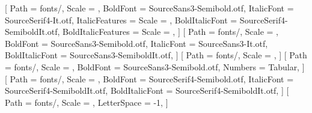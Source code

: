 \setmainfont{SourceSans3-Regular.otf}[
  Path = fonts/,
  Scale = \cv@scale,
  BoldFont = SourceSans3-Semibold.otf,
  ItalicFont = SourceSerif4-It.otf,
  ItalicFeatures = {Scale = },
  BoldItalicFont = SourceSerif4-SemiboldIt.otf,
  BoldItalicFeatures = {Scale = },
]
\setsansfont{SourceSans3-Regular.otf}[
  Path = fonts/,
  Scale = \cv@scale,
  BoldFont = SourceSans3-Semibold.otf,
  ItalicFont = SourceSans3-It.otf,
  BoldItalicFont = SourceSans3-SemiboldIt.otf,
]
\setmonofont{SourceCodePro-Regular.otf}[
  Path = fonts/,
  Scale = ,
]
\newfontfamily{}[
  Path = fonts/,
  Scale = \cv@scale,
  BoldFont = SourceSans3-Semibold.otf,
  Numbers = Tabular,
]
\newfontfamily{}[
  Path = fonts/,
  Scale = \cv@scale,
  BoldFont = SourceSerif4-Semibold.otf,
  ItalicFont = SourceSerif4-SemiboldIt.otf,
  BoldItalicFont = SourceSerif4-SemiboldIt.otf,
]
\newfontfamily{}[
  Path = fonts/,
  Scale = \cv@scale,
  LetterSpace = -1,
]



\AtBeginDocument{\color{cvink}}


\newlength\cvcol    \setlength\cvcol{22mm}   %
\newlength\cvgap    \setlength\cvgap{3mm}    %
\newlength\cvcolw   \setlength\cvcolw{\dimexpr\cvcol-\cvgap\relax}

\setlength{\parindent}{0pt}
\setlength{\parskip}{1.8pt}
\linespread{1} %

